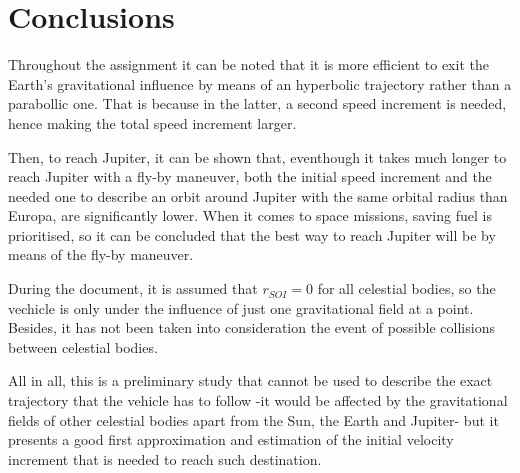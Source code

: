 \section{Conclusions}\label{sec:conclusions}

Throughout the assignment it can be noted that it is more efficient to exit the Earth's gravitational influence by means of an hyperbolic trajectory rather than a parabollic one. That is because in the latter, a second speed increment is needed, hence making the total speed increment larger.

Then, to reach Jupiter, it can be shown that, eventhough it takes much longer to reach Jupiter with a fly-by maneuver, both the initial speed increment and the needed one to describe an orbit around Jupiter with the same orbital radius than Europa, are significantly lower. When it comes to space missions, saving fuel is prioritised, so it can be concluded that the best way to reach Jupiter will be by means of the fly-by maneuver.  

During the document, it is assumed that $r_{SOI} = 0$ for all celestial bodies, so the vechicle is only under the influence of just one gravitational field at a point. Besides, it has not been taken into consideration the event of possible collisions between celestial bodies.

All in all, this is a preliminary study that cannot be used to describe the exact trajectory that the vehicle has to follow -it would be affected by the gravitational fields of other celestial bodies apart from the Sun, the Earth and Jupiter- but it presents a good first approximation and estimation of the initial velocity increment that is needed to reach such destination. 
